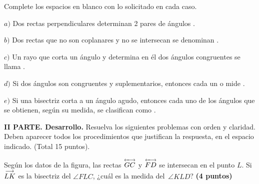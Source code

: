 \documentclass[12pt, fleqn]{article}
\begin{document}
\pagebreak

\hspace{-1cm}
\item Complete los espacios en blanco con lo solicitado en cada caso. \vs

\hspace{-1cm}
{\boldmath $a)$} Dos rectas perpendiculares determinan 2 pares de ángulos \compl. \vs

\hspace{-1cm}
{\boldmath $b)$} Dos rectas que no son coplanares y no se intersecan se denominan \compl.\vs

\hspace{-1cm}
{\boldmath $c)$} Un rayo que corta un ángulo y determina en él dos ángulos congruentes se llama \compl.\vs

\hspace{-1cm}
{\boldmath $d)$} Si dos ángulos son congruentes y suplementarios, entonces cada un o mide \compl.\vs

\hspace{-1cm}
{\boldmath $e)$} Si una bisectriz corta a un ángulo agudo, entonces cada uno de los ángulos que se obtienen, según su medida, se clasifican como \compl.

\vs\vs
\eenu

{\bf II PARTE. Desarrollo.} Resuelva los siguientes problemas con orden y claridad. Deben aparecer todos los procedimientos que justifican la respuesta, en el espacio indicado. (Total 15 puntos). \vp

\benu
\item Según los datos de la figura, las rectas $\stackrel{\leftarrow\!\!\!\longrightarrow}{GC}$ y $\stackrel{\leftarrow\!\!\!\longrightarrow}{FD}$ se intersecan en el punto $L$. Si $\stackrel{\longrightarrow}{LK}$ es la bisectriz del $\angle FLC$, ¿cuál es la medida del $\,\angle KLD$? \hfill{\bf (4 puntos)} \vs
\end{document}
